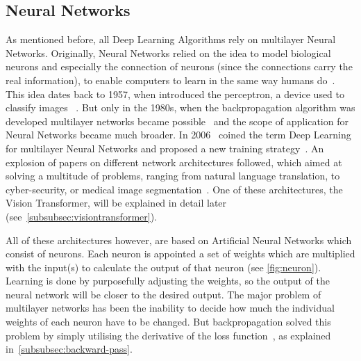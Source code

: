 \subsection{Neural Networks}\label{subsec:neural-networks}
As mentioned before, all Deep Learning Algorithms rely on multilayer Neural Networks.
Originally, Neural Networks relied on the idea to model biological neurons and especially the connection of neurons (since the connections carry the real information), to enable computers to learn in the same way humans do~\autocite{Ertel2017}.
This idea dates back to 1957, when \citeauthor{Rosenblatt1957} introduced the perceptron, a device used to classify images ~\autocite{Rosenblatt1957}.
But only in the 1980s, when the backpropagation algorithm was developed multilayer networks became possible~\autocite[Chapter~1.3]{Skansi2018} and the scope of application for Neural Networks became much broader.
In 2006~\citeauthor{Hinton2006} coined the term Deep Learning for multilayer Neural Networks and proposed a new training strategy~\autocite{Hinton2006}.
An explosion of papers on different network architectures followed, which aimed at solving a multitude of problems, ranging from natural language translation, to cyber-security, or medical image segmentation~\autocite[Chapter~1.3]{Skansi2018}.
One of these architectures, the Vision Transformer, will be explained in detail later (see~\autoref{subsubsec:visiontransformer}).

All of these architectures however, are based on Artificial Neural Networks which consist of neurons.
Each neuron is appointed a set of weights which are multiplied with the input(s) to calculate the output of that neuron (see \autoref{fig:neuron}).
Learning is done by purposefully adjusting the weights, so the output of the neural network will be closer to the desired output.
The major problem of multilayer networks has been the inability to decide how much the individual weights of each neuron have to be changed.
But backpropagation solved this problem by simply utilising the derivative of the loss function~\autocite{Rumelhart1988}, as explained in~\autoref{subsubsec:backward-pass}.


